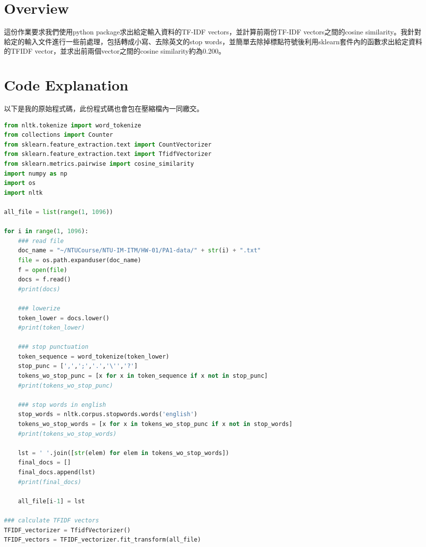 \documentclass[a4paper,12pt]{article}
\begin{document}
\begin{CJK*}{UTF8}{bsmi}

\section{Overview} 這份作業要求我們使用python package求出給定輸入資料的TF-IDF vectors，並計算前兩份TF-IDF vectors之間的cosine similarity。我針對給定的輸入文件進行一些前處理，包括轉成小寫、去除英文的stop words，並簡單去除掉標點符號後利用sklearn套件內的函數求出給定資料的TFIDF vector，並求出前兩個vector之間的cosine similarity約為0.200。

\section{Code Explanation}
以下是我的原始程式碼，此份程式碼也會包在壓縮檔內一同繳交。
\begin{lstlisting}[language=Python, caption=Python code]
from nltk.tokenize import word_tokenize
from collections import Counter
from sklearn.feature_extraction.text import CountVectorizer
from sklearn.feature_extraction.text import TfidfVectorizer
from sklearn.metrics.pairwise import cosine_similarity
import numpy as np
import os
import nltk

all_file = list(range(1, 1096))

for i in range(1, 1096):
    ### read file
    doc_name = "~/NTUCourse/NTU-IM-ITM/HW-01/PA1-data/" + str(i) + ".txt"
    file = os.path.expanduser(doc_name)
    f = open(file)
    docs = f.read()
    #print(docs)
    
    ### lowerize
    token_lower = docs.lower()
    #print(token_lower)
    
    ### stop punctuation
    token_sequence = word_tokenize(token_lower)
    stop_punc = [',',';','.','\'','?']
    tokens_wo_stop_punc = [x for x in token_sequence if x not in stop_punc]
    #print(tokens_wo_stop_punc)
    
    ### stop words in english
    stop_words = nltk.corpus.stopwords.words('english')
    tokens_wo_stop_words = [x for x in tokens_wo_stop_punc if x not in stop_words]
    #print(tokens_wo_stop_words)
    
    lst = ' '.join([str(elem) for elem in tokens_wo_stop_words])
    final_docs = []
    final_docs.append(lst)
    #print(final_docs)
    
    all_file[i-1] = lst
    
### calculate TFIDF vectors
TFIDF_vectorizer = TfidfVectorizer()
TFIDF_vectors = TFIDF_vectorizer.fit_transform(all_file)


\end{lstlisting}
\end{CJK*}
\end{document}
